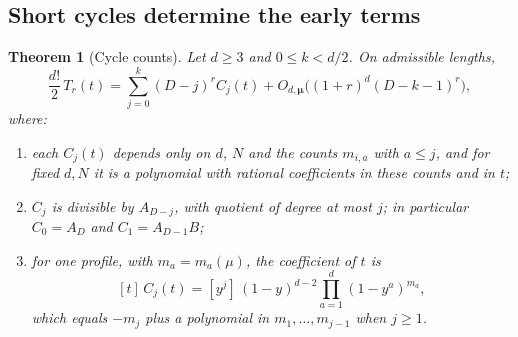 \documentclass[11pt,a4paper]{article}
\newtheorem{theorem}{Theorem}[section]
\theoremstyle{definition}\newtheorem{definition}[theorem]{Definition}
\theoremstyle{remark}\newtheorem{remark}[theorem]{Remark}\newtheorem{example}[theorem]{Example}
\numberwithin{equation}{section}
\begin{document}
\subsection{Short cycles determine the early terms}
\begin{theorem}[Cycle counts]\label{th:cycles}
Let $d\ge3$ and $0\le k<d/2$. On admissible lengths,
\[
 \frac{d!}{2}\,T_r(t)=\sum_{j=0}^{k}(D-j)^rC_j(t)+O_{d,\boldsymbol\mu}\bigl((1+r)^d(D-k-1)^r\bigr),
\]
where:
\begin{enumerate}
\item each $C_j(t)$ depends only on $d$, $N$ and the counts $m_{i,a}$ with $a\le j$, and for fixed $d,N$ it is a polynomial with rational coefficients in these counts and in $t$;
\item $C_j$ is divisible by $A_{D-j}$, with quotient of degree at most $j$; in particular $C_0=A_D$ and $C_1=A_{D-1}B$;
\item for one profile, with $m_a=m_a(\mu)$, the coefficient of $t$ is
\begin{equation}\label{eq:tangent}
 [t]\,C_j(t)=[y^j]\,(1-y)^{d-2}\prod_{a=1}^{d}(1-y^a)^{m_a},
\end{equation}
which equals $-m_j$ plus a polynomial in $m_1,\dots,m_{j-1}$ when $j\ge1$.
\end{enumerate}
\end{theorem}
\end{document}
